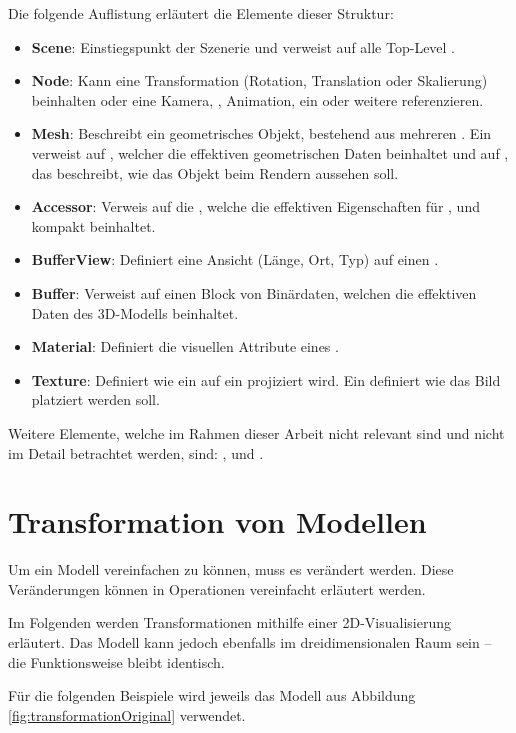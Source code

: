Die folgende Auflistung erläutert die Elemente dieser Struktur:
\begin{itemize}
  \item \textbf{Scene}: Einstiegspunkt der Szenerie und verweist auf alle Top-Level .
  \item \textbf{Node}: Kann eine Transformation (Rotation, Translation oder Skalierung) beinhalten oder eine Kamera, , Animation, ein  oder weitere  referenzieren.
  \item  \textbf{Mesh}: Beschreibt ein geometrisches Objekt, bestehend aus mehreren . Ein  verweist auf , welcher die effektiven geometrischen Daten beinhaltet und auf , das beschreibt, wie das Objekt beim Rendern aussehen soll.
  \item \textbf{Accessor}: Verweis auf die , welche die effektiven Eigenschaften für ,  und  kompakt beinhaltet.
  \item \textbf{BufferView}: Definiert eine Ansicht (Länge, Ort, Typ) auf einen .
  \item \textbf{Buffer}: Verweist auf einen Block von Binärdaten, welchen die effektiven Daten des 3D-Modells beinhaltet.
  \item \textbf{Material}: Definiert die visuellen Attribute eines .
  \item \textbf{Texture}: Definiert wie ein  auf ein  projiziert wird. Ein  definiert wie das Bild platziert werden soll.
\end{itemize}

Weitere Elemente, welche im Rahmen dieser Arbeit nicht relevant sind und nicht im Detail betrachtet werden, sind: ,  und .

\section{Transformation von Modellen}

Um ein Modell vereinfachen zu können, muss es verändert werden.
Diese Veränderungen können in Operationen vereinfacht erläutert werden.

Im Folgenden werden Transformationen mithilfe einer 2D-Visualisierung erläutert. Das Modell kann jedoch ebenfalls im dreidimensionalen Raum sein – die Funktionsweise bleibt identisch.

Für die folgenden Beispiele wird jeweils das Modell aus Abbildung \ref{fig:transformationOriginal} verwendet.

